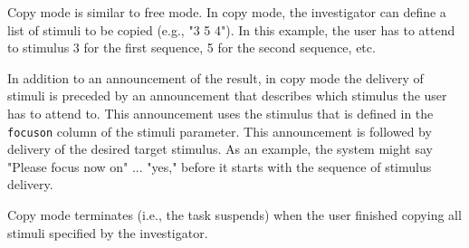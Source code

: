 \documentclass[letterpaper,oneside,12pt]{article}
\begin{document}
Copy mode is similar to free mode. In copy mode, the investigator can define a 
list of stimuli to be copied (e.g., "3 5 4"). In this example, the user has to 
attend to stimulus 3 for the first sequence, 5 for the second sequence, etc.

In addition to an announcement of the result, in copy mode the delivery of 
stimuli is preceded by an announcement that describes which stimulus the user
has to attend to. This announcement uses the stimulus that is defined in the
\texttt{focuson} column of the stimuli parameter. This announcement is followed by
delivery of the desired target stimulus. As an example, the system might say
"Please focus now on" ... "yes," before it starts with the sequence of
stimulus delivery.

Copy mode terminates (i.e., the task suspends) when the user finished copying 
all stimuli specified by the investigator.
\end{document}
